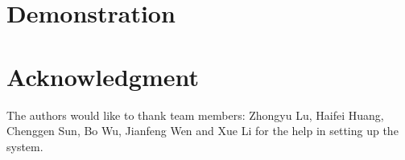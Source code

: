 \documentclass[conference]{IEEEtran}
\begin{document}
\section{Demonstration}




%




\section*{Acknowledgment}


The authors would like to thank \ring team members: Zhongyu Lu, Haifei Huang, Chenggen Sun, Bo Wu, Jianfeng Wen and Xue Li for the help in setting up the system.







%
%
%




\balance



\end{document}

